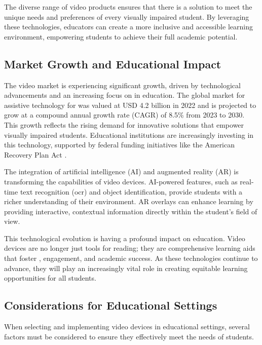 The diverse range of video  products ensures that there is a solution to meet the unique needs and preferences of every visually impaired student. By leveraging these technologies, educators can create a more inclusive and accessible learning environment, empowering students to achieve their full academic potential.

\subsection{Market Growth and Educational Impact}
The video  market is experiencing significant growth, driven by technological advancements and an increasing focus on  in education. The global market for assistive technology for  was valued at USD 4.2 billion in 2022 and is projected to grow at a compound annual growth rate (CAGR) of 8.5\% from 2023 to 2030. This growth reflects the rising demand for innovative solutions that empower visually impaired students. Educational institutions are increasingly investing in this technology, supported by federal funding initiatives like the American Recovery Plan Act \supercite{AmericanRecoveryAct}.

The integration of artificial intelligence (AI) and augmented reality (AR) is transforming the capabilities of video  devices. AI-powered features, such as real-time text recognition (\gls{ocr}) and object identification, provide students with a richer understanding of their environment. AR overlays can enhance learning by providing interactive, contextual information directly within the student's field of view.\supercite{aimodels2024, msseeingai, envision}

This technological evolution is having a profound impact on education. Video  devices are no longer just tools for reading; they are comprehensive learning aids that foster , engagement, and academic success. As these technologies continue to advance, they will play an increasingly vital role in creating equitable learning opportunities for all students.\supercite{StudentOutcomesResearch, Foley2017AssistiveTechnologyOutcomes}

\subsection{Considerations for Educational Settings}
When selecting and implementing video  devices in educational settings, several factors must be considered to ensure they effectively meet the needs of students.

